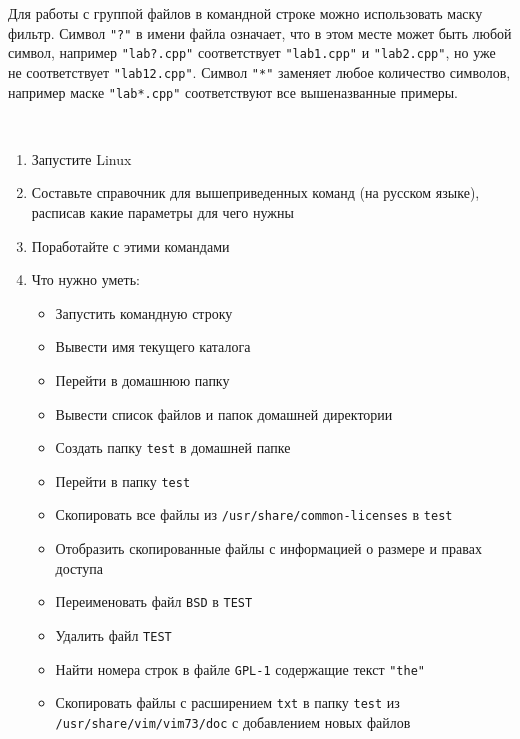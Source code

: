 \documentclass[a4paper,12pt]{article}
\begin{document}
    \begin{flushleft}
    Для работы с группой файлов в командной строке можно использовать маску фильтр. Символ \texttt{"?"} в имени файла означает, что в этом месте может быть любой символ, например \texttt{"lab?.cpp"} соответствует \texttt{"lab1.cpp"} и \texttt{"lab2.cpp"}, но уже не соответствует \texttt{"lab12.cpp"}. Символ \texttt{"*"} заменяет любое количество символов, например маске \texttt{"lab*.cpp"} соответствуют все вышеназванные примеры.
    \end{flushleft}

    \newpage

    \begin{flushleft}
         \\[0.5em]
        \begin{enumerate}
            \item Запустите Linux
            \item Составьте справочник для вышеприведенных команд (на русском языке), расписав какие параметры для чего нужны
            \item Поработайте с этими командами
            \item Что нужно уметь:
            \begin{itemize}
                \item Запустить командную строку
                \item Вывести имя текущего каталога
                \item Перейти в домашнюю папку
                \item Вывести список файлов и папок домашней директории
                \item Создать папку \texttt{test} в домашней папке
                \item Перейти в папку \texttt{test}
                \item Скопировать все файлы из \texttt{/usr/share/common-licenses} в \texttt{test}
                \item Отобразить скопированные файлы с информацией о размере и правах доступа
                \item Переименовать файл \texttt{BSD} в \texttt{TEST}
                \item Удалить файл \texttt{TEST}
                \item Найти номера строк в файле \texttt{GPL-1} содержащие текст \texttt{"the"}
                \item Скопировать файлы с расширением \texttt{txt} в папку \texttt{test} из \texttt{/usr/share/vim/vim73/doc} с добавлением новых файлов

\end{itemize}
\end{enumerate}
\end{flushleft}
\end{document}
